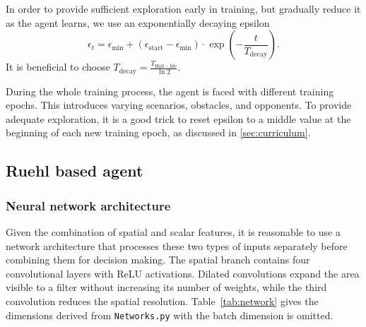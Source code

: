 \documentclass[11pt,a4paper]{article}
\begin{document}
In order to provide sufficient exploration early in training, but gradually reduce it as the agent learns, we use an exponentially decaying epsilon
\begin{equation}
\epsilon_t=\epsilon_{\min}+
(\epsilon_{\mathrm{start}}-\epsilon_{\min}) \cdot \exp\left(-\frac{t}{T_{\mathrm{decay}}}\right).
\end{equation}
It is beneficial to choose $T_{\mathrm{decay}} = \frac{T_{\mathrm{Half-life}}}{\ln 2}$.

During the whole training process, the agent is faced with different training epochs. 
This introduces varying scenarios, obstacles, and opponents.
To provide adequate exploration, it is a good trick to reset epsilon to a middle value at the beginning of each new training epoch, as discussed in \ref{sec:curriculum}.


\subsection{Ruehl based agent}

\subsubsection{Neural network architecture}
Given the combination of spatial and scalar features, it is reasonable to use a network architecture that processes these two types of inputs separately before combining them for decision making.
The spatial branch contains four convolutional layers with ReLU activations.
Dilated convolutions expand the area visible to a filter without increasing its number of weights, while the third convolution reduces the spatial resolution. 
Table~\ref{tab:network} gives the dimensions derived from
\texttt{Networks.py} with the batch dimension is omitted.
\end{document}
